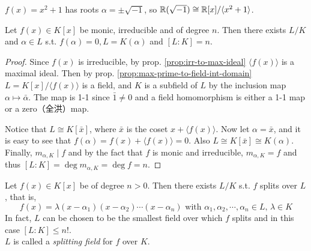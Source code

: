 \begin{example}
  $f(x) = x^2 + 1$ has roots $\alpha = \pm \sqrt{-1}$, so $\mathbb{R}(\sqrt{-1}) \cong \mathbb{R}[x] / \langle x^2 + 1 \rangle$.
\end{example}

\begin{theorem} \label{thm:field-ext-1}
  Let $f(x) \in K[x]$ be monic, irreducible and of degree $n$. Then there exists
  $L / K$ and $\alpha \in L$ s.t. $f(\alpha) = 0, L = K(\alpha)$ and $[L: K] = n$.
\end{theorem}

\begin{proof}
  Since $f(x)$ is irreducible, by prop. \ref{prop:irr-to-max-ideal} $\langle f(x) \rangle$ is a maximal ideal.
  Then by prop. \ref{prop:max-prime-to-field-int-domain} $L = K[x] / \langle f(x) \rangle$ is a field, and $K$ is a subfield
  of $L$ by the inclusion map $\alpha \mapsto \bar\alpha$. The map is 1-1 since $\bar{1} \neq 0$ and
  a field homomorphism is either a 1-1 map or a zero（全洪）map.

  Notice that $L \cong K[\bar{x}]$, where $\bar{x}$ is the coset $x + \langle f(x) \rangle$.
  Now let $\alpha = \bar{x}$, and it is easy to see that $f(\alpha) = f(x) + \langle f(x) \rangle = 0$.
  Also $L \cong K[\bar{x}] \cong K(\alpha)$. Finally, $m_{\alpha, K} \mid f$ and by the fact that
  $f$ is monic and irreducible, $m_{\alpha, K} = f$ and thus $[L: K] = \deg m_{\alpha, K} = \deg f = n$.
\end{proof}

\begin{theorem}
  Let $f(x) \in K[x]$ be of degree $n > 0$. Then there exists $L/K$ s.t. $f$
  splits over $L$, that is,
  \[ f(x) = \lambda (x - \alpha_1) (x - \alpha_2) \cdots (x - \alpha_n) \text{ with }
    \alpha_1, \alpha_2, \cdots, \alpha_n \in L,\, \lambda \in K \]
  In fact, $L$ can be chosen to be the smallest field over which $f$ splits and in this case $[L : K] \leq n!$.\\
  $L$ is called a \emph{splitting field}  for $f$ over $K$.
\end{theorem}

